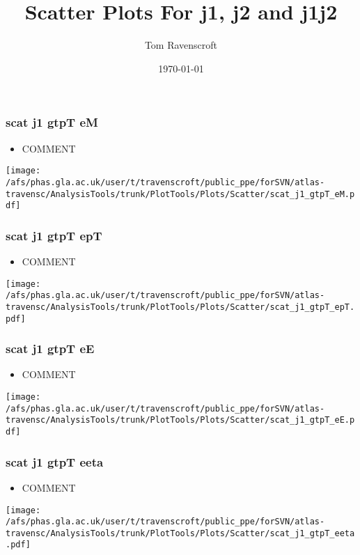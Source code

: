 \documentclass{beamer}
\title{Scatter Plots For j1, j2 and j1j2}
\author{Tom Ravenscroft}
\date{\today}
\institute{University of Glasgow}
\begin{document}
\maketitle

\begin{frame}
\frametitle{scat j1 gtpT eM}
\begin{itemize}
\item COMMENT
\end{itemize}
\begin{center}
\texttt{[image: /afs/phas.gla.ac.uk/user/t/travenscroft/public\_ppe/forSVN/atlas-travensc/AnalysisTools/trunk/PlotTools/Plots/Scatter/scat\_j1\_gtpT\_eM.pdf]}
\end{center}
\end{frame}

\begin{frame}
\frametitle{scat j1 gtpT epT}
\begin{itemize}
\item COMMENT
\end{itemize}
\begin{center}
\texttt{[image: /afs/phas.gla.ac.uk/user/t/travenscroft/public\_ppe/forSVN/atlas-travensc/AnalysisTools/trunk/PlotTools/Plots/Scatter/scat\_j1\_gtpT\_epT.pdf]}
\end{center}
\end{frame}

\begin{frame}
\frametitle{scat j1 gtpT eE}
\begin{itemize}
\item COMMENT
\end{itemize}
\begin{center}
\texttt{[image: /afs/phas.gla.ac.uk/user/t/travenscroft/public\_ppe/forSVN/atlas-travensc/AnalysisTools/trunk/PlotTools/Plots/Scatter/scat\_j1\_gtpT\_eE.pdf]}
\end{center}
\end{frame}

\begin{frame}
\frametitle{scat j1 gtpT eeta}
\begin{itemize}
\item COMMENT
\end{itemize}
\begin{center}
\texttt{[image: /afs/phas.gla.ac.uk/user/t/travenscroft/public\_ppe/forSVN/atlas-travensc/AnalysisTools/trunk/PlotTools/Plots/Scatter/scat\_j1\_gtpT\_eeta.pdf]}
\end{center}
\end{frame}
\end{document}
